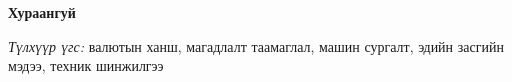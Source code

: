 
\vspace{10mm}
\begin{center}
\textbf{\large Хураангуй}
\end{center}
\sloppy


\vspace{3mm}
\textit{Түлхүүр үгс:} валютын ханш, магадлалт таамаглал, машин сургалт, эдийн засгийн мэдээ, техник шинжилгээ
